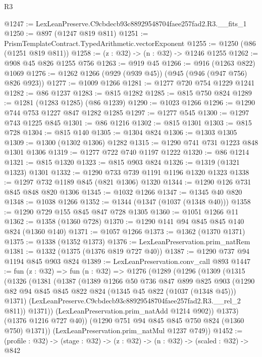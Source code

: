 \begin{lexlean}{R3}
\begin{coremodule}
@1247 := LexLeanPreserve.C9cbdecb93c88929548704faee257fad2.R3.__fits_1
@1250 := @897 (@1247 @819 @811)
@1251 := PrismTemplateContract.TypedArithmetic.vectorExponent
@1255 := @1250 (@86 (@1251 @819 @811))
@1258 := (z : @32) -> (n : @32) -> @1246 @1255
@1262 := @908 @45 @826 @1255 @756
@1263 := @919 @45
@1266 := @916 (@1263 @822) @1069
@1276 := @1262 @1266 (@929 (@939 @45)) (@945 (@946 (@947 @756) @826 @923))
@1277 := @1009 @1266
@1281 := @1277 @720 @754 @1229 @1241
@1282 := @86 @1237
@1283 := @815 @1282
@1285 := @815 @750 @824
@1289 := @1281 (@1283 @1285) (@86 @1239)
@1290 := @1023 @1266
@1296 := @1290 @744 @753 @1227 @847 @1282 @1285
@1297 := @1277 @545
@1300 := @1297 @743 @1225 @845
@1301 := @86 @1216
@1302 := @815 @1301
@1303 := @815 @728
@1304 := @815 @140
@1305 := @1304 @824
@1306 := @1303 @1305
@1309 := @1300 (@1302 @1306) @1282
@1315 := @1290 @741 @731 @1223 @848 @1301 @1306
@1319 := @1277 @722 @740 @1197 @1222
@1320 := @86 @1214
@1321 := @815 @1320
@1323 := @815 @903 @824
@1326 := @1319 (@1321 @1323) @1301
@1332 := @1290 @733 @739 @1191 @1196 @1320 @1323
@1338 := @1297 @732 @1189 @845 (@821 @1306) @1320
@1344 := @1290 @126 @731 @845 @848 @820 @1306
@1345 := @1032 @1266
@1347 := @1345 @40 @820
@1348 := @1038 @1266
@1352 := @1344 (@1347 (@1037 (@1348 @40)))
@1358 := @1290 @729 @155 @845 @847 @728 @1305
@1360 := @1051 @1266 @11
@1362 := @1358 (@1360 @728)
@1370 := @1290 @141 @94 @845 @845 @140 @824 (@1360 @140)
@1371 := @1057 @1266
@1373 := @1362 (@1370 @1371)
@1375 := @1338 (@1352 @1373)
@1376 := LexLeanPreservation.prim_natRem
@1381 := @1332 (@1375 (@1376 @819 @727 @40))
@1387 := @1290 @737 @94 @1194 @845 @903 @824
@1389 := LexLeanPreservation.conv_call @893
@1447 := fun (z : @32) =>
  fun (n : @32) =>
  @1276
    (@1289
      (@1296
        (@1309
          (@1315
            (@1326
              (@1381
                (@1387
                  (@1389
                    @1266
                    @50
                    @736
                    @847
                    @899
                    @825
                    @903
                    (@1290 @82 @94 @845 @845 @822 @824 (@1345 @45 @822 (@1037 (@1348 @45))) @1371)
                    (LexLeanPreserve.C9cbdecb93c88929548704faee257fad2.R3.__rel_2 @811))
                  @1371))
              (LexLeanPreservation.prim_natAdd @1214 @902))
            @1373)
          (@1376 @1216 @727 @40))
        (@1290 @751 @94 @845 @845 @750 @824 (@1360 @750) @1371))
      (LexLeanPreservation.prim_natMul @1237 @749))
@1452 := (profile : @32) -> (stage : @32) -> (z : @32) -> (n : @32) -> (scaled : @32) -> @842

\end{coremodule}
\end{lexlean}

